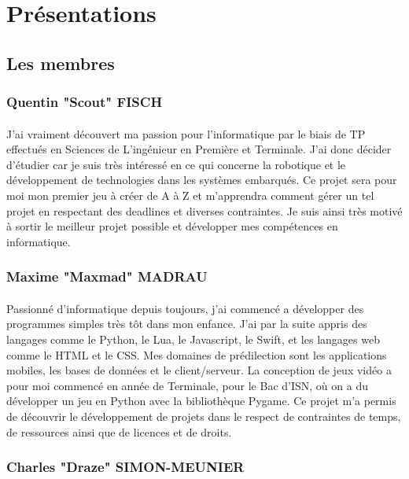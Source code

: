 \documentclass{article}
\begin{document}
\section{Présentations}
\subsection{Les membres}
\subsubsection{Quentin "Scout" FISCH}
\paragraph{}J'ai vraiment découvert ma passion pour l'informatique par le biais de TP effectués en Sciences de L'ingénieur en Première et Terminale. J'ai donc décider d'étudier car je suis très intéressé en ce qui concerne la robotique et le développement de technologies dans les systèmes embarqués. Ce projet sera pour moi mon premier jeu à créer de A à Z et m'apprendra comment gérer un tel projet en respectant des deadlines et diverses contraintes. Je suis ainsi très motivé à sortir le meilleur projet possible et développer mes compétences en informatique.

\subsubsection{Maxime "Maxmad" MADRAU}
\paragraph{}Passionné d'informatique depuis toujours, j'ai commencé a développer des programmes simples très tôt dans mon enfance. J'ai par la suite appris des langages comme le Python, le Lua, le Javascript, le Swift, et les langages web comme le HTML et le CSS. Mes domaines de prédilection sont les applications mobiles, les bases de données et le client/serveur. La conception de jeux vidéo a pour moi commencé en année de Terminale, pour le Bac d'ISN, où on a du développer un jeu en Python avec la bibliothèque Pygame. Ce projet m'a permis de découvrir le développement de projets dans le respect de contraintes de temps, de ressources ainsi que de licences et de droits.

\subsubsection{Charles "Draze" SIMON-MEUNIER}
\end{document}
